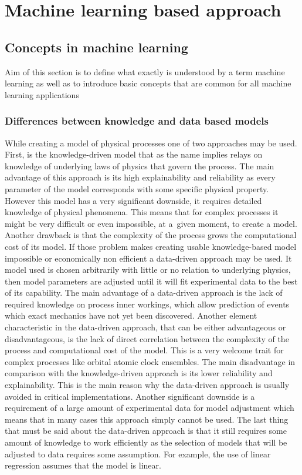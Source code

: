 \chapter{Machine learning based approach}


\section{Concepts in machine learning}
\FloatBarrier
Aim of this section is to define what exactly is understood by a term machine learning as well
as to introduce basic concepts that are common for all machine learning applications

\subsection{Differences between knowledge and data based models}
\FloatBarrier
While creating a model of physical processes one of two approaches may be used.
First, is the knowledge-driven model that as the name implies relays on knowledge of underlying
laws of physics that govern the process.
The main advantage of this approach is its high explainability and reliability as every parameter
of the model corresponds with some specific physical property.
However this model has a very significant downside, it requires detailed knowledge of physical
phenomena. This means that for complex processes it might be very difficult or even
impossible, at a~given moment, to create a model. Another drawback is that the complexity of
the process grows the computational cost of its model.
If those problem makes creating usable knowledge-based model impossible or economically
non efficient a data-driven approach may be used.
It model used is chosen arbitrarily with little or no relation to underlying physics,
then model parameters are adjusted until it will fit experimental data to the best of its
capability.
The main advantage of a data-driven approach is the lack of required knowledge on process 
inner workings, which allow prediction of events which exact mechanics have not 
yet been discovered.
Another element characteristic in the data-driven approach, that can be either advantageous or
disadvantageous, is the lack of direct correlation between the complexity 
of the process and computational cost of the model.
This is a very welcome trait for complex processes like orbital atomic clock ensembles.
The main disadvantage in comparison with the knowledge-driven approach is its lower reliability and
explainability. This is the main reason why the data-driven approach is usually avoided in
critical implementations. Another significant downside is a requirement of a large amount of
experimental data for model adjustment which means that in many cases this approach simply
cannot be used.
The last thing that must be said about the data-driven approach is that it still requires some
amount of knowledge to work efficiently as the selection of models that will be adjusted to
data requires some assumption. For example, the use of linear regression assumes that the model
is linear.

